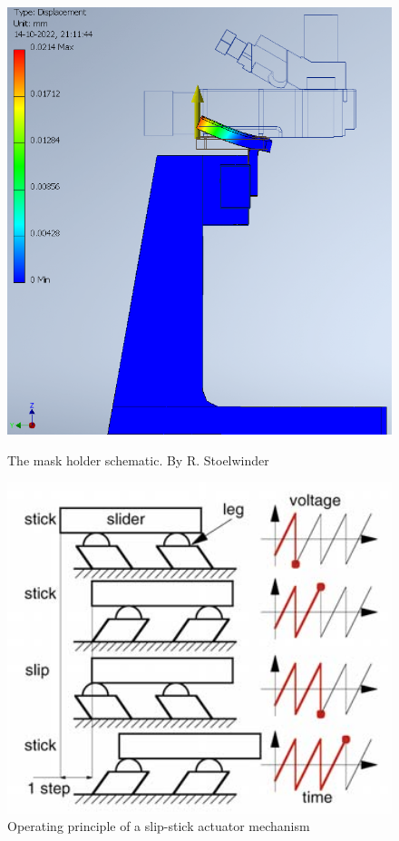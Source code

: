 \documentclass[11pt]{article}
\begin{document}
\begin{figure}[H]
  \centering
  \begin{minipage}[b]{0.45\textwidth}
    \includegraphics[width=\textwidth]{img/rigidity_simulation/study_8.png}
    \caption{The mask holder schematic. By R. Stoelwinder}
    \label{fig:CAD_mask_holder}
  \end{minipage}
  \hfill
  \begin{minipage}[b]{0.45\textwidth}
    \includegraphics[width=1\textwidth]{img/sample_holder_and_mask/Stick-slip-piezo-actuator-operation-principle.png}
    \caption{Operating principle of a slip-stick actuator mechanism 
    \citep{mazerollePositioningHandlingMeasuring2003}}
    \label{fig:slip_stick_principle}
  \end{minipage}
\end{figure}
\end{document}
